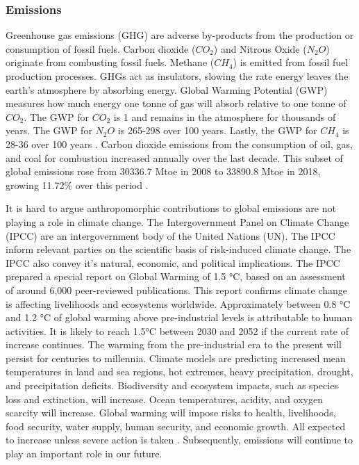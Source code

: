 \documentclass[12pt]{article}
\begin{document}
\subsubsection{Emissions}
Greenhouse gas emissions (GHG) are adverse by-products from the production or consumption of fossil fuels. 
Carbon dioxide ($CO_2$) and Nitrous Oxide ($N_2O$) originate from combusting fossil fuels. 
Methane ($CH_4$) is emitted from fossil fuel production processes. 
GHGs act as insulators, slowing the rate energy leaves the earth's atmosphere by absorbing energy. 
Global Warming Potential (GWP) measures how much energy one tonne of gas will absorb relative to one tonne of $CO_2$. 
The GWP for $CO_2$ is 1 and remains in the atmosphere for thousands of years. 
The GWP for $N_2O$ is 265-298 over 100 years. 
Lastly, the GWP for $CH_4$ is 28-36 over 100 years \cite{W:4}. 
Carbon dioxide emissions from the consumption of oil, gas, and coal for combustion increased annually over the last decade. 
This subset of global emissions rose from 30336.7 Mtoe in 2008 to 33890.8 Mtoe in 2018, growing 11.72\% over this period \cite{TR:3}. 

It is hard to argue anthropomorphic contributions to global emissions are not playing a role in climate change. 
The Intergovernment Panel on Climate Change (IPCC) are an intergovernment body of the United Nations (UN). 
The IPCC inform relevant parties on the scientific basis of risk-induced climate change.
The IPCC also convey it's natural, economic, and political implications. 
The IPCC prepared a special report on Global Warming of 1.5 \si{\degree}C, based on an assessment of around 6,000 peer-reviewed publications. 
This report confirms climate change is affecting livelihoods and ecosystems worldwide.
Approximately between 0.8 \si{\degree}C and 1.2 \si{\degree}C of global warming above pre-industrial levels is attributable to human activities. 
It is likely to reach 1.5\si{\degree}C between 2030 and 2052 if the current rate of increase continues. 
The warming from the pre-industrial era to the present will persist for centuries to millennia.
Climate models are predicting increased mean temperatures in land and sea regions, hot extremes, heavy precipitation, drought, and precipitation deficits. 
Biodiversity and ecosystem impacts, such as species loss and extinction, will increase. 
Ocean temperatures, acidity, and oxygen scarcity will increase. 
Global warming will impose risks to health, livelihoods, food security, water supply, human security, and economic growth.
All expected to increase unless severe action is taken \cite{TR:5}. 
Subsequently, emissions will continue to play an important role in our future.
\end{document}
